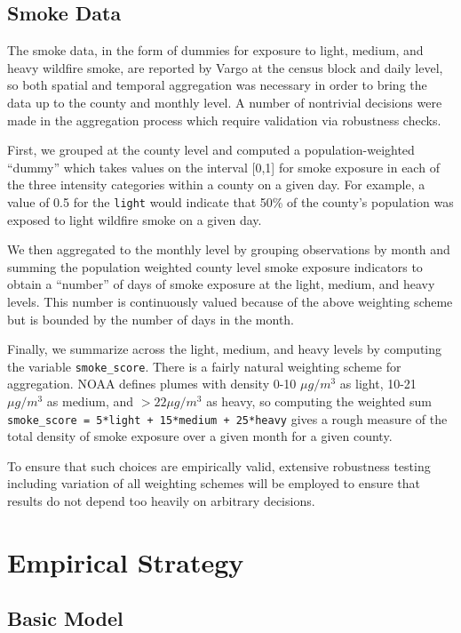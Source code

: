 \documentclass[]{article}
\begin{document}
\subsection{Smoke Data}\label{smoke-data}

The smoke data, in the form of dummies for exposure to light, medium,
and heavy wildfire smoke, are reported by Vargo at the census block and
daily level, so both spatial and temporal aggregation was necessary in
order to bring the data up to the county and monthly level. A number of
nontrivial decisions were made in the aggregation process which require
validation via robustness checks.

First, we grouped at the county level and computed a population-weighted
``dummy'' which takes values on the interval {[}0,1{]} for smoke
exposure in each of the three intensity categories within a county on a
given day. For example, a value of 0.5 for the \texttt{light} would
indicate that 50\% of the county's population was exposed to light
wildfire smoke on a given day.

We then aggregated to the monthly level by grouping observations by
month and summing the population weighted county level smoke exposure
indicators to obtain a ``number'' of days of smoke exposure at the
light, medium, and heavy levels. This number is continuously valued
because of the above weighting scheme but is bounded by the number of
days in the month.

Finally, we summarize across the light, medium, and heavy levels by
computing the variable \texttt{smoke\_score}. There is a fairly natural
weighting scheme for aggregation. NOAA defines plumes with density 0-10
\(\mu g/m^3\) as light, 10-21 \(\mu g/m^3\) as medium, and
\(>22\mu g/m^3\) as heavy, so computing the weighted sum
\texttt{smoke\_score\ =\ 5*light\ +\ 15*medium\ +\ 25*heavy} gives a
rough measure of the total density of smoke exposure over a given month
for a given county.

To ensure that such choices are empirically valid, extensive robustness
testing including variation of all weighting schemes will be employed to
ensure that results do not depend too heavily on arbitrary decisions.

\section{Empirical Strategy}\label{empirical-strategy}

\subsection{Basic Model}\label{basic-model}
\end{document}
